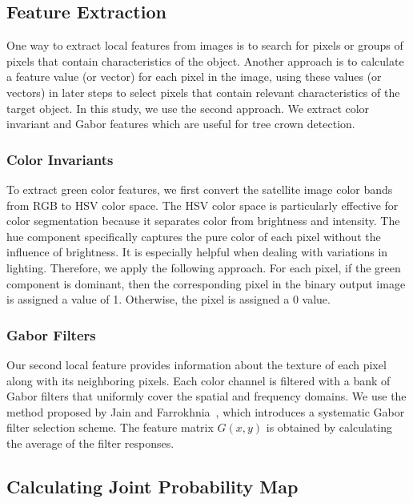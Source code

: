 \documentclass{article}
\begin{document}
\subsection{Feature Extraction}

One way to extract local features from images is to search for pixels or groups of pixels that contain characteristics of the object. Another approach is to calculate a feature value (or vector) for each pixel in the image, using these values (or vectors) in later steps to select pixels that contain relevant characteristics of the target object. In this study, we use the second approach. We extract color invariant and Gabor features which are useful for tree crown detection.

\subsubsection{Color Invariants}

To extract green color features, we first convert the satellite image color bands from RGB to HSV color space. The HSV color space is particularly effective for color segmentation because it separates color from brightness and intensity. The hue component specifically captures the pure color of each pixel without the influence of brightness. It is especially helpful when dealing with variations in lighting. Therefore, we apply the following approach. For each pixel, if the green component is dominant, then the corresponding pixel in the binary output image is assigned a value of 1. Otherwise, the pixel is assigned a 0 value.

\subsubsection{Gabor Filters}

Our second local feature provides information about the texture of each pixel along with its neighboring pixels. Each color channel is filtered with a bank of Gabor filters that uniformly cover the spatial and frequency domains. We use the method proposed by  Jain and Farrokhnia~\cite{JAIN19911167}, which introduces a systematic Gabor filter selection scheme. The feature matrix $G(x,y)$ is obtained by calculating the average of the filter responses.

\subsection{Calculating Joint Probability Map}
\end{document}
